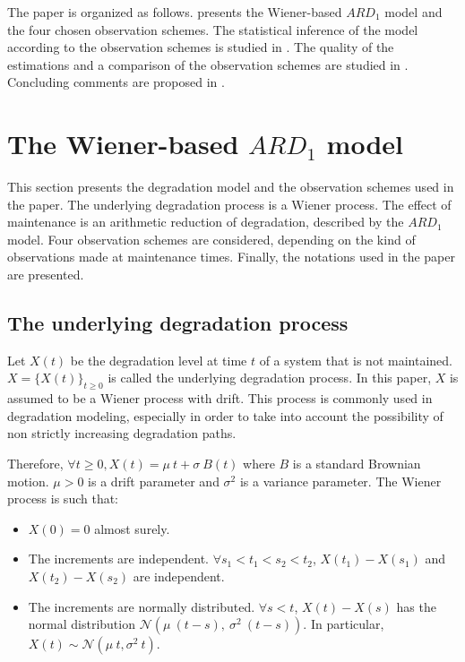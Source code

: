 The paper is organized as follows.   presents the Wiener-based $ARD_1$ model and the four chosen observation schemes. The statistical inference of the model according to the observation schemes is studied in . The quality of the estimations and a comparison of the observation schemes are studied in . Concluding comments are proposed in .



\section{The Wiener-based $ARD_1$ model}
\label{section:model}

This section presents the degradation model and the observation schemes used in the paper. The underlying degradation process is a Wiener process. The effect of maintenance is an arithmetic reduction of degradation, described by the $ARD_1$ model. Four observation schemes are considered, depending on the kind of observations made at maintenance times. Finally, the notations used in the paper are presented.

\subsection{The underlying degradation process} 
\label{section:Wiener}

Let $X(t)$ be the degradation level at time $t$ of a system that is not maintained. $X=\{X(t)\}_{t\geq 0}$ is called the underlying degradation process. 
In this paper, $X$ is assumed to be a Wiener process with drift. This process is commonly used in degradation modeling, especially in order to take into account the possibility of non strictly increasing degradation paths.

Therefore, $\forall t \geq 0, X(t)=\mu\ t +\sigma\ B(t)$ where $B$ is a standard Brownian motion. $\mu > 0$ is a drift parameter and $\sigma^2$ is a variance parameter. The Wiener process is such that:

\begin{itemize}

\item $X(0) = 0$ almost surely.

\item The increments are independent. $\forall s_1 < t_1 < s_2 < t_2$, $X(t_1) - X(s_1)$ and $X(t_2) - X(s_2)$ are independent.

\item The increments are normally distributed. $\forall s < t$, $X(t)-X(s)$ has the normal distribution $\mathcal{N}\left(\mu\ (t-s),\ \sigma^2\ (t-s) \right)$. In particular, $X(t)\sim \mathcal{N}(\mu\ t, \sigma^2\ t)$.

\end{itemize}



